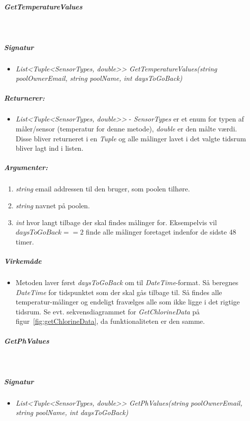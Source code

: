 \subparagraph{GetTemperatureValues}\ %


\subparagraph{Signatur}
\begin{itemize}
	\item \textit{List<Tuple<SensorTypes, double>> GetTemperatureValues(string poolOwnerEmail, string poolName, int daysToGoBack)}
\end{itemize}

\subparagraph{Returnerer:}
\begin{itemize}
	\item \textit{List<Tuple<SensorTypes, double>>} - \textit{SensorTypes} er et enum for typen af måler/sensor (temperatur for denne metode), \textit{double} er den målte værdi. Disse bliver returneret i en \textit{Tuple} og alle målinger lavet i det valgte tidsrum bliver lagt ind i listen.
\end{itemize}

\subparagraph{Argumenter:}
\begin{enumerate}
	\item \textit{string} email addressen til den bruger, som poolen tilhøre.
	\item \textit{string} navnet på poolen.
	\item \textit{int} hvor langt tilbage der skal findes målinger for. Eksempelvis vil $daysToGoBack == 2$ finde alle målinger foretaget indenfor de sidste 48 timer.
\end{enumerate}

\subparagraph{Virkemåde}
\begin{itemize}
	\item Metoden laver først \textit{daysToGoBack} om til \textit{DateTime}-format. Så beregnes \textit{DateTime} for tidspunktet som der skal gås tilbage til. Så findes alle temperatur-målinger og endeligt fravælges alle som ikke ligge i det rigtige tidsrum. Se evt. sekvensdiagrammet for \textit{GetChlorineData} på figur~\ref{fig:getChlorineData}, da funktionaliteten er den samme.
\end{itemize}


\subparagraph{GetPhValues}\ %


\subparagraph{Signatur}
\begin{itemize}
	\item \textit{List<Tuple<SensorTypes, double>> GetPhValues(string poolOwnerEmail, string poolName, int daysToGoBack)}
\end{itemize}

